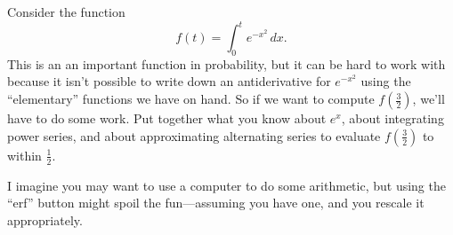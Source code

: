 \documentclass{ximera}
\begin{document}
\begin{question}
  Consider the function \[f(t) = \displaystyle\int_0^t e^{-x^2} \, dx.\]  This is an an important function in probability, but it can be hard to work with because it isn't possible to write down an antiderivative for \(e^{-x^2}\) using the ``elementary'' functions we have on hand.  So if we want to compute \(f(\displaystyle\frac{3}{2})\), we'll have to do some work.  Put together what you know about \(e^x\), about integrating power series, and about approximating alternating series to evaluate \(f(\displaystyle\frac{3}{2})\) to within \(\displaystyle\frac{1}{2}\).

I imagine you may want to use a computer to do some arithmetic, but using the ``erf'' button might spoil the fun---assuming you have one, and you rescale it appropriately.


\end{question}
\end{document}
